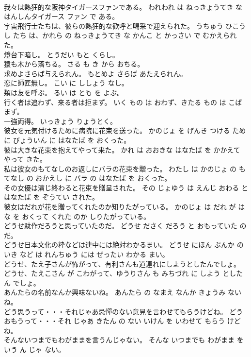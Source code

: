 \documentclass[8pt]{extreport}
\begin{document}
\begin{CJK}{UTF8}{min}
\\	我々は熱狂的な阪神タイガースファンである。	われわれ は ねっきょうてき な はんしんタイガース ファン で ある。	
\\	宇宙飛行士たちは、彼らの熱狂的な歓呼と喝采で迎えられた。	うちゅう ひこうし たち は、かれら の ねっきょうてき な かんこ と かっさい で むかえられた。	
\\	燈台下暗し。	とうだい もと くらし。	
\\	猿も木から落ちる。	さる も き から おちる。	
\\	求めよさらば与えられん。	もとめよ さらば あたえられん。	
\\	恋に師匠無し。	こい に ししょう なし。	
\\	類は友を呼ぶ。	るい は とも を よぶ。	
\\	行く者は追わず、来る者は拒まず。	いく もの は おわず、きたる もの は こばまず。	
\\	一強両得。	いっきょう りょうとく。	
\\	彼女を元気付けるために病院に花束を送った。	かのじょ を げんき つける ため に びょういん に はなたば を おくった。	
\\	彼は大きな花束を抱えてやって来た。	かれ は おおきな はなたば を かかえて やって きた。	
\\	私は彼女のもてなしのお返しにバラの花束を贈った。	わたし は かのじょ の もてなし の おかえし に バラ の はなたば を おくった。	
\\	その女優は演じ終わると花束を贈呈された。	その じょゆう は えんじ おわる と はなたば を ぞうてい された。	
\\	彼女はだれが花を贈ってくれたのか知りたがっている。	かのじょ は だれ が はな を おくって くれた のか しりたがっている。	
\\	どうせ駄作だろうと思っていたのだ。	どうせ ださく だろう と おもっていた のだ。	
\\	どうせ日本文化の粋などは連中には絶対わかるまい。	どうせ にほん ぶんか の いき など は れんちゅう には ぜったい わかる まい。	
\\	どうせ、たえ子さんが怖がって、有利さんも道連れにしようとしたんでしょ。	どうせ、たえこさん が こわがって、ゆうりさん も みちづれ に しよう とした ん でしょ。	
\\	あんたらの名前なんか興味ないね。	あんたら の なまえ なんか きょうみ ない ね。	
\\	どう思うって・・・それじゃあ忌憚のない意見を言わせてもらうけどね。	どう おもうって・・・それ じゃあ きたん の ない いけん を いわせて もらう けど ね。	
\\	そんないつまでもわがままを言うんじゃない。	そんな いつまでも わがまま を いう ん じゃ ない。	

\end{CJK}
\end{document}
